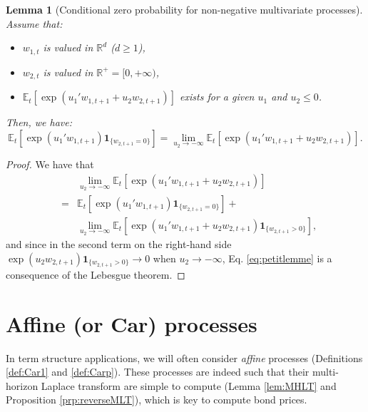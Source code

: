 \documentclass[
  12pt,
]{book}
\providecommand{\tightlist}{%
  \setlength{\itemsep}{0pt}\setlength{\parskip}{0pt}}
\newtheorem{lemma}{Lemma}[chapter]
\theoremstyle{definition}
\theoremstyle{definition}
\theoremstyle{definition}
\theoremstyle{definition}
\theoremstyle{remark}
\begin{document}
\begin{lemma}[Conditional zero probability for non-negative multivariate processes]
\protect\hypertarget{lem:lemPetitLemme}{}\label{lem:lemPetitLemme}Assume that:

\begin{itemize}
\tightlist
\item
  \(w_{1,t}\) is valued in \(\mathbb{R}^{d}\) (\(d \geq 1\)),
\item
  \(w_{2,t}\) is valued in \(\mathbb{R}^+ = [0, + \infty )\),
\item
  \(\mathbb{E}_t \left[ \exp \left( u_1 ' w_{1,t+1} + u_2 w_{2,t+1} \right) \right]\) exists for a given \(u_1\) and \(u_2 \leq 0\).
\end{itemize}

Then, we have:
\begin{equation}
\mathbb{E}_t \left[ \exp( u_1 ' w_{1,t+1})  \textbf{1}_{\{w_{2,t+1} = 0 \}} \right] =  \underset{u_2 \rightarrow -\infty}{\lim} \mathbb{E}_t \left[ \exp( u_1 ' w_{1,t+1} + u_2   w_{2,t+1} )  \right].\label{eq:petitlemme}
\end{equation}
\end{lemma}

\begin{proof}
We have that
\begin{eqnarray*}
&&\underset{u_2 \rightarrow -\infty}{\lim} \mathbb{E}_t \left[ \exp( u_1 ' w_{1,t+1} + u_2   w_{2,t+1} )  \right] \\
&=& \mathbb{E}_t \left[ \exp( u_1 ' w_{1,t+1})   \textbf{1}_{\{w_{2,t+1} = 0 \}} \right] +\\
&& \underset{u_2 \rightarrow -\infty}{\lim}   \mathbb{E}_t \left[ \exp( u_1 ' w_{1,t+1} + u_2   w_{2,t+1} )  \textbf{1}_{\{w_{2,t+1} > 0 \}}  \right] ,
\end{eqnarray*}
and since in the second term on the right-hand side \(\exp(u_2 w_{2,t+1}) \textbf{1}_{\{w_{2,t+1} > 0 \}} \rightarrow 0\) when \(u_2 \rightarrow -\infty\), Eq. \eqref{eq:petitlemme} is a consequence of the Lebesgue theorem.
\end{proof}

\hypertarget{AffineCar}{%
\section{Affine (or Car) processes}\label{AffineCar}}

In term structure applications, we will often consider \emph{affine} processes (Definitions \ref{def:Car1} and \ref{def:Carp}). These processes are indeed such that their multi-horizon Laplace transform are simple to compute (Lemma \ref{lem:MHLT} and Proposition \ref{prp:reverseMLT}), which is key to compute bond prices.
\end{document}
